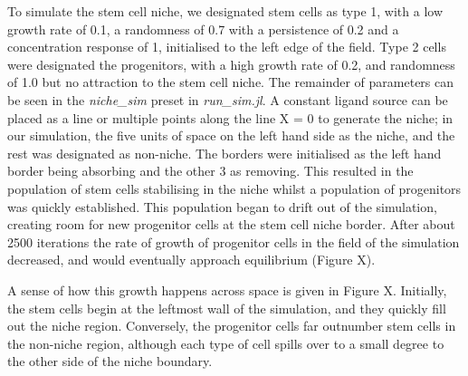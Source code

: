 \documentclass[12pt]{article}
\begin{document}
To simulate the stem cell niche, we designated stem cells as type 1, 
with a low growth rate of 0.1, a randomness of 0.7 with a persistence of 
0.2 and a concentration response of 1, initialised to the left edge of 
the field. Type 2 cells were designated the progenitors, with a high 
growth rate of 0.2, and randomness of 1.0 but no attraction to the stem 
cell niche. The remainder of parameters can be seen in the {\itshape 
niche\_sim} preset in {\itshape run\_sim.jl}. A constant ligand source can be 
placed as a line or multiple points along the line X = 0 to generate the 
niche; in our simulation, the five units of space on the left hand side 
as the niche, and the rest was designated as non-niche. The borders were 
initialised as the left hand border being absorbing and the other 3 as 
removing. This resulted in the population of stem cells stabilising in 
the niche whilst a population of progenitors was quickly established. 
This population began to drift out of the simulation, creating room for 
new progenitor cells at the stem cell niche border. After about 2500 
iterations the rate of growth of progenitor cells in the field of the 
simulation decreased, and would eventually approach equilibrium (Figure 
X).

A sense of how this growth happens across space is given in Figure X. 
Initially, the stem cells begin at the leftmost wall of the simulation, 
and they quickly fill out the niche region. Conversely, the progenitor 
cells far outnumber stem cells in the non-niche region, although each 
type of cell spills over to a small degree to the other side of the 
niche boundary.
\end{document}

